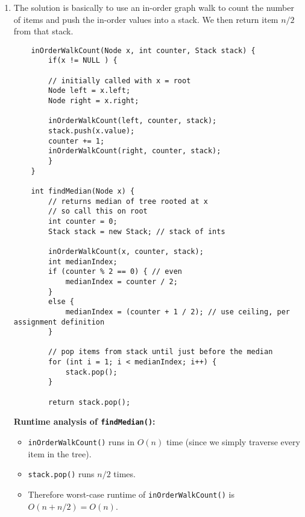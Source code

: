 \documentclass{article}
\begin{document}
\begin{enumerate}
\begin{enumerate}
	\end{enumerate}
	
	\item The solution is basically to use an in-order graph walk to count the number of items and push the in-order values into a stack. We then return item $n/2$ from that stack.
	
	\begin{lstlisting}
	inOrderWalkCount(Node x, int counter, Stack stack) {
		if(x != NULL ) {

		// initially called with x = root
		Node left = x.left;
		Node right = x.right;

		inOrderWalkCount(left, counter, stack);
		stack.push(x.value);
		counter += 1;
		inOrderWalkCount(right, counter, stack);
		}
	}

	int findMedian(Node x) {
		// returns median of tree rooted at x
		// so call this on root
		int counter = 0;
		Stack stack = new Stack; // stack of ints		
		
		inOrderWalkCount(x, counter, stack);
		int medianIndex;
		if (counter % 2 == 0) { // even
			medianIndex = counter / 2;
		}
		else {
			medianIndex = (counter + 1 / 2); // use ceiling, per assignment definition
		}

		// pop items from stack until just before the median
		for (int i = 1; i < medianIndex; i++) {
			stack.pop();
		}
	
		return stack.pop();
	\end{lstlisting}
	\textbf{Runtime analysis of \texttt{findMedian()}:}
	\begin{itemize}
		\item \texttt{inOrderWalkCount()} runs in $O(n)$ time (since we simply traverse every item in the tree).
		\item \texttt{stack.pop()} runs $n/2$ times.
	\item Therefore worst-case runtime of \texttt{inOrderWalkCount()} is $O(n + n/2) = O(n)$.
	\end{itemize}   
	
\end{enumerate}
\end{document}

